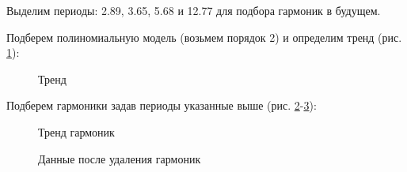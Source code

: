 \documentclass[a4paper,oneside,14pt]{extreport}
\begin{document}
Выделим периоды: 2.89, 3.65, 5.68 и 12.77 для подбора гармоник в будущем.

\newpage
Подберем полиномиальную модель (возьмем порядок 2) и определим тренд (рис. \ref{task2_predict_poly}):
\begin{figure}[!h]
	\caption{Тренд}
	\label{task2_predict_poly}
\end{figure}

Подберем гармоники задав периоды указанные выше (рис. \ref{task2_predict_harm}-\ref{task2_del_harm}):
\begin{figure}[!h]
	\caption{Тренд гармоник}
	\label{task2_predict_harm}
\end{figure}

\newpage
\begin{figure}[!h]
	\caption{Данные после удаления гармоник}
	\label{task2_del_harm}
\end{figure}
\end{document}
